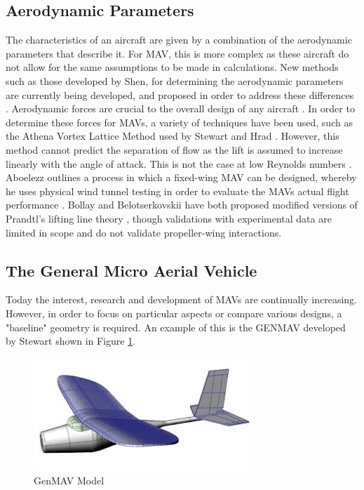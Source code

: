 \subsection{Aerodynamic Parameters}
\label{sec:AerodynamicParameters}
The characteristics of an aircraft are given by a combination of the aerodynamic parameters that describe it. For MAV, this is more complex as these aircraft do not allow for the same assumptions to be made in calculations. New methods such as those developed by Shen, for determining the aerodynamic parameters are currently being developed, and proposed in order to address these differences \cite{Shen2018, Roberts2011}. Aerodynamic forces are crucial to the overall design of any aircraft \cite{Aero2012}. In order to determine these forces for MAVs, a variety of techniques have been used, such as the Athena Vortex Lattice Method used by Stewart and Hrad \cite{Stewart2007, Hrad2010}. However, this method cannot predict the separation of flow as the lift is assumed to increase linearly with the angle of attack.  This is not the case at low Reynolds numbers \cite{Zhang2022}. Aboelezz outlines a process in which a fixed-wing MAV can be designed, whereby he uses physical wind tunnel testing in order to evaluate the MAVs actual flight performance \cite{Aboelezz2020}. Bollay and Belotserkovskii have both proposed modified versions of Prandtl's lifting line theory \cite{Bollay1939, Belotserkovskii1968}, though validations with experimental data are limited in scope and do not validate propeller-wing interactions.

\subsection{The General Micro Aerial Vehicle}
\label{subsec:GenMAV}
Today the interest, research and development of MAVs are continually increasing. However, in order to focus on particular aspects or compare various designs, a "baseline" geometry is required. An example of this is the GENMAV developed by Stewart \cite{Stewart2007} shown in Figure \ref{fig:genmav2}.

\begin{figure}[H]
    \centering
    \includegraphics[width=0.8\linewidth]{04_Progress/Figs/genMav.jpeg}
    \caption{GenMAV Model \cite{Stewart2007}}
    \label{fig:genmav2}
\end{figure}

